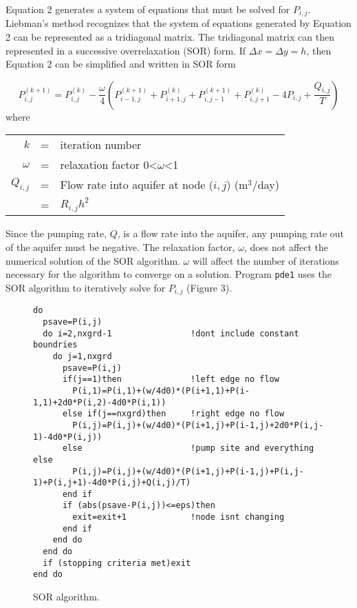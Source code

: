 \documentclass[titlepage,11pt]{article}
\begin{document}
Equation 2 generates a system of equations that must be solved for
$P_{i,j}$.  Liebman's method recognizes that the system of equations
generated by Equation 2 can be represented as a tridiagonal matrix.
The tridiagonal matrix can then represented in a successive
overrelaxation (SOR) form. If $\Delta x=\Delta y=h$, then Equation 2
can be simplified and written in SOR form

\begin{singlespacing}
    \begin{equation}
        P_{i,j}^{(k+1)}=P_{i,j}^{(k)}-\frac{\omega}{4}
        \left(P_{i-1,j}^{(k+1)}+P_{i+1,j}^{(k)}+P_{i,j-1}^{(k+1)}+
        P_{i,j+1}^{(k)}-4P_{i,j}+\frac{Q_{i,j}}{T}\right)
    \end{equation}
    where
    \begin{center}
        \begin{tabular}{rcl}
            $k$&=&iteration number\\
            $\omega$&=& relaxation factor 0<$\omega$<1\\
            $Q_{i,j}$&=&Flow rate into aquifer at node ($i,j$) (m$^3$/day)\\
            &=&$R_{i,j}h^2$
        \end{tabular}
    \end{center}
\end{singlespacing}

Since the pumping rate, $Q$, is a flow rate into the aquifer, any
pumping rate out of the aquifer must be negative. The relaxation
factor, $\omega$, does not affect the numerical solution of the SOR
algorithm. $\omega$ will affect the number of iterations necessary
for the algorithm to converge on a solution.
 Program \verb"pde1" uses the SOR algorithm to iteratively solve for
$P_{i,j}$ (Figure 3).

\begin{figure}[!h] \label{fig:stop}
\begin{center}
\begin{Verbatim}[frame=single]
do
  psave=P(i,j)
  do i=2,nxgrd-1                !dont include constant boundries
    do j=1,nxgrd
      psave=P(i,j)
      if(j==1)then              !left edge no flow
        P(i,1)=P(i,1)+(w/4d0)*(P(i+1,1)+P(i-1,1)+2d0*P(i,2)-4d0*P(i,1))
      else if(j==nxgrd)then     !right edge no flow
        P(i,j)=P(i,j)+(w/4d0)*(P(i+1,j)+P(i-1,j)+2d0*P(i,j-1)-4d0*P(i,j))
      else                      !pump site and everything else
        P(i,j)=P(i,j)+(w/4d0)*(P(i+1,j)+P(i-1,j)+P(i,j-1)+P(i,j+1)-4d0*P(i,j)+Q(i,j)/T)
      end if
      if (abs(psave-P(i,j))<=eps)then
        exit=exit+1             !node isnt changing
      end if
    end do
  end do
  if (stopping criteria met)exit
end do
\end{Verbatim}
\caption{SOR algorithm.}
\end{center}
\end{figure}
\end{document}

